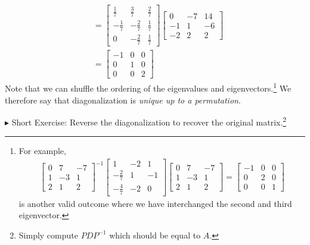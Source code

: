 \begin{solution}
\begin{align*}
&=
\begin{bmatrix}
\frac{1}{7}&\frac{3}{7}&\frac{2}{7}\\ 
-\frac{1}{7}&-\frac{2}{7}&\frac{1}{7}\\ 
0&-\frac{2}{7}&\frac{1}{7}
\end{bmatrix}
\begin{bmatrix}
0&-7&14\\ 
-1&1&-6\\ 
-2&2&2
\end{bmatrix} \\
&=
\begin{bmatrix}
-1 & 0 & 0 \\
0 & 1 & 0 \\
0 & 0 & 2
\end{bmatrix}
\end{align*}
Note that we can shuffle the ordering of the eigenvalues and eigenvectors.\footnote{For example, \begin{align*}
\begin{bmatrix}
0 & 7 & -7 \\ 
1 & -3 & 1 \\ 
2 & 1 & 2 
\end{bmatrix}^{-1}
\begin{bmatrix}
1 & -2 & 1 \\ 
-\frac{2}{7} & 1 & -1 \\ 
-\frac{4}{7} & -2 & 0
\end{bmatrix}
\begin{bmatrix}
0 & 7 & -7 \\ 
1 & -3 & 1 \\ 
2 & 1 & 2 
\end{bmatrix} 
=
\begin{bmatrix}
-1 & 0 & 0 \\
0 & 2 & 0 \\
0 & 0 & 1
\end{bmatrix}
\end{align*} is another valid outcome where we have interchanged the second and third eigenvector.} We therefore say that diagonalization is \textit{unique up to a permutation}.
\end{solution}
$\blacktriangleright$ Short Exercise: Reverse the diagonalization to recover the original matrix.\footnote{Simply compute $PDP^{-1}$ which should be equal to $A$.}

